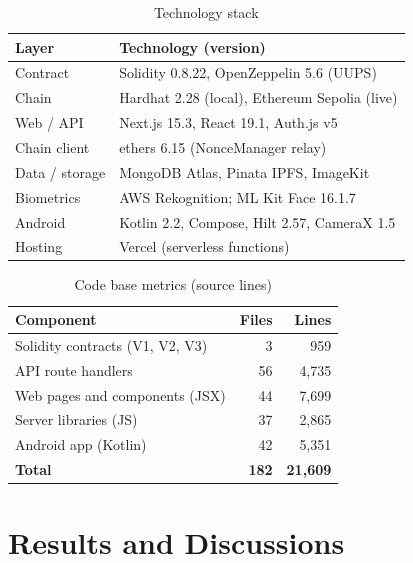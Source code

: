 \documentclass[conference]{IEEEtran}
\begin{document}
\begin{table}[t]
\caption{Technology stack}
\label{tab:stack}
\centering
\footnotesize
\begin{tabular}{@{}ll@{}}
\toprule
\textbf{Layer} & \textbf{Technology (version)} \\
\midrule
Contract & Solidity 0.8.22, OpenZeppelin 5.6 (UUPS) \\
Chain & Hardhat 2.28 (local), Ethereum Sepolia (live) \\
Web / API & Next.js 15.3, React 19.1, Auth.js v5 \\
Chain client & ethers 6.15 (NonceManager relay) \\
Data / storage & MongoDB Atlas, Pinata IPFS, ImageKit \\
Biometrics & AWS Rekognition; ML Kit Face 16.1.7 \\
Android & Kotlin 2.2, Compose, Hilt 2.57, CameraX 1.5 \\
Hosting & Vercel (serverless functions) \\
\bottomrule
\end{tabular}
\end{table}

\begin{table}[t]
\caption{Code base metrics (source lines)}
\label{tab:loc}
\centering
\footnotesize
\begin{tabular}{@{}lrr@{}}
\toprule
\textbf{Component} & \textbf{Files} & \textbf{Lines} \\
\midrule
Solidity contracts (V1, V2, V3) & 3 & 959 \\
API route handlers & 56 & 4,735 \\
Web pages and components (JSX) & 44 & 7,699 \\
Server libraries (JS) & 37 & 2,865 \\
Android app (Kotlin) & 42 & 5,351 \\
\midrule
\textbf{Total} & \textbf{182} & \textbf{21,609} \\
\bottomrule
\end{tabular}
\end{table}

\section{Results and Discussions}
\label{sec:results}
\end{document}

